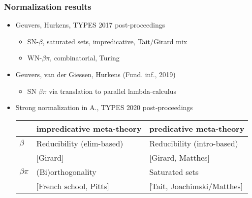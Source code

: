 \documentclass[t,fleqn,usenames,dvipsnames]{beamer}
\begin{document}
\begin{frame}%
  \frametitle{Normalization results}
  \vspace{-2ex}
  \begin{itemize}
  \item Geuvers, Hurkens, TYPES 2017 post-proceedings
    \begin{itemize}
    \item SN-$\beta$, saturated sets, impredicative, Tait/Girard mix
    \item WN-$\beta\pi$, combinatorial, Turing
    \end{itemize}
  \item Geuvers, van der Giessen, Hurkens (Fund. inf., 2019)
    \begin{itemize}
    \item SN $\beta\pi$ via translation to parallel lambda-calculus
    \end{itemize}
  \item Strong normalization in A., TYPES 2020 post-proceedings
    \\[1ex]
    \begin{center}
    \begin{tabular}{@{}||l|l|l||@{}}
     \hline
     \hline
       & impredicative meta-theory & predicative meta-theory \\
     \hline
     $\beta$ & Reducibility (elim-based) & Reducibility (intro-based) \\
       & [Girard] & [Girard, Matthes]\\
     \hline
     $\beta\pi$ & (Bi)orthogonality & Saturated sets \\
       & [French school, Pitts] & [Tait, Joachimski/Matthes] \\
     \hline
     \hline
    \end{tabular}
    \end{center}
  \end{itemize}
\end{frame}
\end{document}
